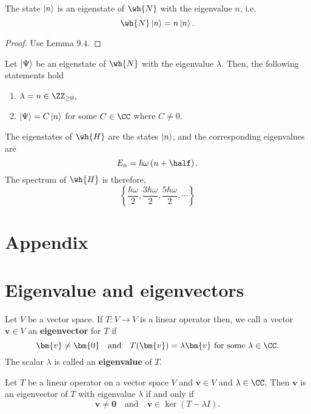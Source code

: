 \documentclass[12pt, a4paper]{article}
\begin{document}
\begin{corollary}
    The state \(\ket{n}\) is an eigenstate of \(\wh{N}\) with the eigenvalue \(n\), i.e.
    \[\wh{N}\ket{n}= n\ket{n}.\]
\end{corollary}

\begin{proof}
    Use Lemma \(9.4\).
\end{proof}

\begin{mdthm}
    Let \(\ket{\Psi}\) be an eigenstate of \(\wh{N}\) with the eigenvalue \(\lambda\). Then, the following statements hold 
    \begin{enumerate}
        \item \(\lambda = n \in \ZZ_{\geq 0}\),
        \item \(\ket{\Psi} = C \ket{n}\) for some \(C \in \CC\) where \(C \neq 0\).
    \end{enumerate}
\end{mdthm}

\begin{mdthm}
    The eigenstates of \(\wh{H}\) are the states \(\ket{n}\), and the corresponding eigenvalues are 
    \[E_n = \hbar \omega \left( n+\half \right).\]
    The spectrum of \(\wh{H}\) is therefore, 
    \[\left\{ \frac{\hbar \omega}{2},\frac{3\hbar \omega}{2},\frac{5\hbar \omega}{2},\cdots \right\}\]
\end{mdthm}

\pagebreak

\appendix

\section*{Appendix}

\section{Eigenvalue and eigenvectors}

\begin{definition}
    Let \(V\) be a vector space. If \(T:V \to V\) is a linear operator then, we call a vector \(\bm{v} \in V\) an \textbf{eigenvector} for \(T\) if 
    \[\bm{v} \neq \bm{0} \quad \text{and} \quad T(\bm{v}) = \lambda\bm{v} \text{ for some \(\lambda \in \CC\).}\]
    The scalar \(\lambda\) is called an \textbf{eigenvalue} of \(T\).
\end{definition}

\begin{lemma}
    Let $T$ be a linear operator on a vector space $V$ and $\bm{v} \in V$ and $\lambda \in \CC.$ Then $\bm{v}$ is an eigenvector of $T$ with eigenvalue $\lambda$ if and only if $$\bm{v} \neq \bm{0} \quad \text{and} \quad \bm{v} \in \ker{(T-\lambda I)}.$$
    \end{lemma}
\end{document}
